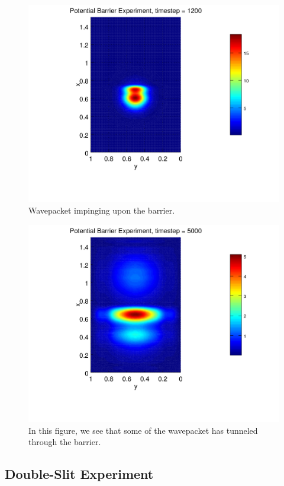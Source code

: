 \documentclass[letterpaper,12pt]{article}
\begin{document}
\begin{figure}[!htbp]
\centering
\includegraphics[scale=0.65,trim = 2mm 25mm 2mm 15mm]{barrier2.png}
\caption{Wavepacket impinging upon the barrier.}
\label{fig:b2}
\end{figure}


\begin{figure}[!htbp]
\centering
\includegraphics[scale=0.65,trim = 2mm 25mm 2mm 15mm]{barrier3.png}
\caption{In this figure, we see that some of the wavepacket has tunneled through the barrier.}
\label{fig:b3}
\end{figure}


\subsection{Double-Slit Experiment}
\end{document}
